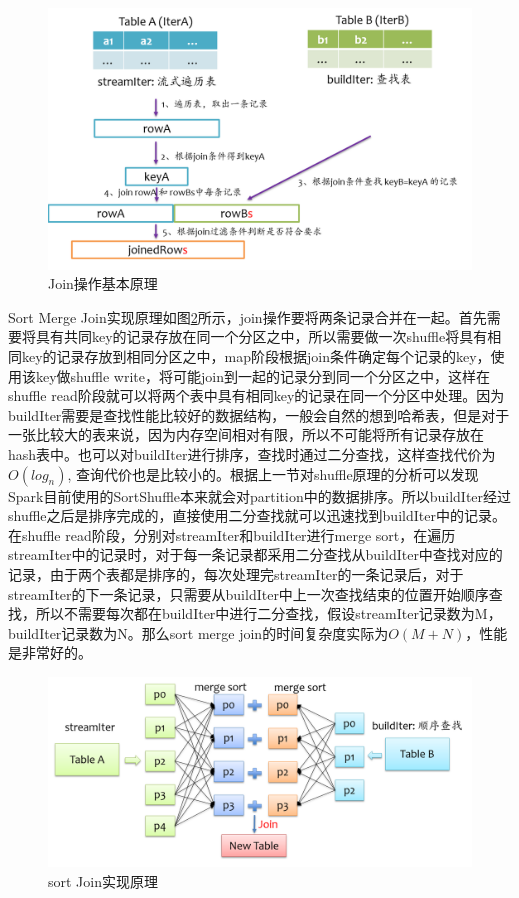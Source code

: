 \begin{figure}[htbp]
    \centering
    \includegraphics[width=1\textwidth]{Img/spark-sql-join-basic.png}
    \caption{Join操作基本原理}
    \label{fig:join-basic}
\end{figure}

Sort Merge Join实现原理如图\ref{fig:sort-join}所示，join操作要将两条记录合并在一起。首先需要将具有共同key的记录存放在同一个分区之中，所以需要做一次shuffle将具有相同key的记录存放到相同分区之中，map阶段根据join条件确定每个记录的key，使用该key做shuffle write，将可能join到一起的记录分到同一个分区之中，这样在shuffle read阶段就可以将两个表中具有相同key的记录在同一个分区中处理。因为buildIter需要是查找性能比较好的数据结构，一般会自然的想到哈希表，但是对于一张比较大的表来说，因为内存空间相对有限，所以不可能将所有记录存放在hash表中。也可以对buildIter进行排序，查找时通过二分查找，这样查找代价为$O(log_n)$, 查询代价也是比较小的。根据上一节对shuffle原理的分析可以发现Spark目前使用的SortShuffle本来就会对partition中的数据排序。所以buildIter经过shuffle之后是排序完成的，直接使用二分查找就可以迅速找到buildIter中的记录。在shuffle read阶段，分别对streamIter和buildIter进行merge sort，在遍历streamIter中的记录时，对于每一条记录都采用二分查找从buildIter中查找对应的记录，由于两个表都是排序的，每次处理完streamIter的一条记录后，对于streamIter的下一条记录，只需要从buildIter中上一次查找结束的位置开始顺序查找，所以不需要每次都在buildIter中进行二分查找，假设streamIter记录数为M，buildIter记录数为N。那么sort merge join的时间复杂度实际为$O(M+N)$，性能是非常好的。

\begin{figure}[htbp]
    \centering
    \includegraphics[width=1\textwidth]{Img/spark-sql-sort-join.png}
    \caption{sort Join实现原理}
    \label{fig:sort-join}
\end{figure}

